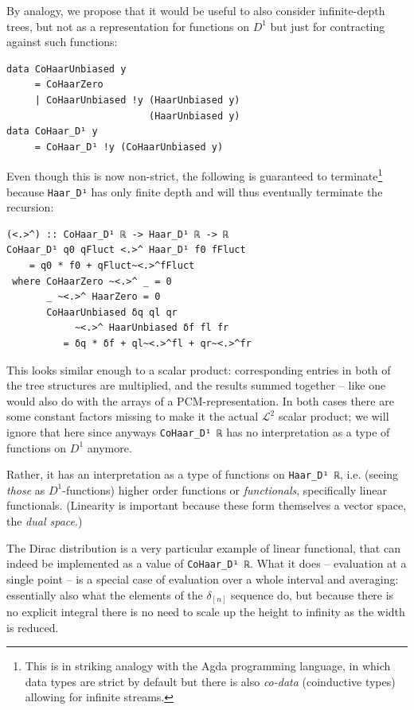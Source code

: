 \documentclass[sigplan,screen]{acmart}
\theoremstyle{acmplain}
\theoremstyle{acmdefinition}
\begin{document}
By analogy, we propose that it would be useful to also consider infinite-depth trees, but not as a representation for functions on $D^1$ but just for contracting against such functions:
\begin{lstlisting}
data CoHaarUnbiased y
     = CoHaarZero
     | CoHaarUnbiased !y (HaarUnbiased y)
                         (HaarUnbiased y)
data CoHaar_D¹ y
     = CoHaar_D¹ !y (CoHaarUnbiased y)
\end{lstlisting}
Even though this is now non-strict, the following is guaranteed to terminate\footnote{%
This is in striking analogy with the Agda programming language, in which data types are strict by default but there is also \emph{co-data} (coinductive types) allowing for infinite streams.
} because \verb`Haar_D¹` has only finite depth and will thus eventually terminate the recursion:
\begin{lstlisting}
(<.>^) :: CoHaar_D¹ ℝ -> Haar_D¹ ℝ -> ℝ
CoHaar_D¹ q0 qFluct <.>^ Haar_D¹ f0 fFluct
    = q0 * f0 + qFluct~<.>^fFluct
 where CoHaarZero ~<.>^ _ = 0
       _ ~<.>^ HaarZero = 0
       CoHaarUnbiased δq ql qr
            ~<.>^ HaarUnbiased δf fl fr
          = δq * δf + ql~<.>^fl + qr~<.>^fr
\end{lstlisting}
This looks similar enough to a scalar product: corresponding entries in both of the tree structures are multiplied, and the results summed together -- like one would also do with the arrays of a PCM-representation. In both cases there are some constant factors missing to make it the actual $\mathcal{L}^2$ scalar product; we will ignore that here since anyways \verb`CoHaar_D¹ ℝ` has no interpretation as a type of functions on $D^1$ anymore.

Rather, it has an interpretation as a type of functions on \verb`Haar_D¹ ℝ`, i.e. (seeing \emph{those} as $D^1$-functions) higher order functions or \emph{functionals}, specifically linear functionals. (Linearity is important because these form themselves a vector space, the \emph{dual space}.)

The Dirac distribution is a very particular example of linear functional, that can indeed be implemented as a value of \verb`CoHaar_D¹ ℝ`. What it does -- evaluation at a single point -- is a special case of evaluation over a whole interval and averaging: essentially also what the elements of the $\delta_{[n]}$ sequence do, but because there is no explicit integral there is no need to scale up the height to infinity as the width is reduced.
\end{document}
